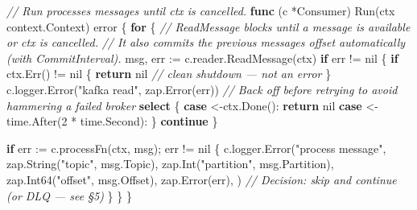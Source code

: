 \documentclass[
]{article}
\newenvironment{Shaded}{}{}
\newcommand{\CommentTok}[1]{\textcolor[rgb]{0.38,0.63,0.69}{\textit{#1}}}
\newcommand{\ControlFlowTok}[1]{\textcolor[rgb]{0.00,0.44,0.13}{\textbf{#1}}}
\newcommand{\DataTypeTok}[1]{\textcolor[rgb]{0.56,0.13,0.00}{#1}}
\newcommand{\DecValTok}[1]{\textcolor[rgb]{0.25,0.63,0.44}{#1}}
\newcommand{\KeywordTok}[1]{\textcolor[rgb]{0.00,0.44,0.13}{\textbf{#1}}}
\newcommand{\NormalTok}[1]{#1}
\newcommand{\OperatorTok}[1]{\textcolor[rgb]{0.40,0.40,0.40}{#1}}
\newcommand{\OtherTok}[1]{\textcolor[rgb]{0.00,0.44,0.13}{#1}}
\newcommand{\StringTok}[1]{\textcolor[rgb]{0.25,0.44,0.63}{#1}}
\begin{document}
\begin{Shaded}
\begin{Highlighting}[]
\CommentTok{// Run processes messages until ctx is cancelled.}
\KeywordTok{func} \OperatorTok{(}\NormalTok{c }\OperatorTok{*}\NormalTok{Consumer}\OperatorTok{)}\NormalTok{ Run}\OperatorTok{(}\NormalTok{ctx context}\OperatorTok{.}\NormalTok{Context}\OperatorTok{)} \DataTypeTok{error} \OperatorTok{\{}
    \ControlFlowTok{for} \OperatorTok{\{}
        \CommentTok{// ReadMessage blocks until a message is available or ctx is cancelled.}
        \CommentTok{// It also commits the previous message\textquotesingle{}s offset automatically (with CommitInterval).}
\NormalTok{        msg}\OperatorTok{,}\NormalTok{ err }\OperatorTok{:=}\NormalTok{ c}\OperatorTok{.}\NormalTok{reader}\OperatorTok{.}\NormalTok{ReadMessage}\OperatorTok{(}\NormalTok{ctx}\OperatorTok{)}
        \ControlFlowTok{if}\NormalTok{ err }\OperatorTok{!=} \OtherTok{nil} \OperatorTok{\{}
            \ControlFlowTok{if}\NormalTok{ ctx}\OperatorTok{.}\NormalTok{Err}\OperatorTok{()} \OperatorTok{!=} \OtherTok{nil} \OperatorTok{\{}
                \ControlFlowTok{return} \OtherTok{nil} \CommentTok{// clean shutdown — not an error}
            \OperatorTok{\}}
\NormalTok{            c}\OperatorTok{.}\NormalTok{logger}\OperatorTok{.}\NormalTok{Error}\OperatorTok{(}\StringTok{"kafka read"}\OperatorTok{,}\NormalTok{ zap}\OperatorTok{.}\NormalTok{Error}\OperatorTok{(}\NormalTok{err}\OperatorTok{))}
            \CommentTok{// Back off before retrying to avoid hammering a failed broker}
            \ControlFlowTok{select} \OperatorTok{\{}
            \ControlFlowTok{case} \OperatorTok{\textless{}{-}}\NormalTok{ctx}\OperatorTok{.}\NormalTok{Done}\OperatorTok{():}
                \ControlFlowTok{return} \OtherTok{nil}
            \ControlFlowTok{case} \OperatorTok{\textless{}{-}}\NormalTok{time}\OperatorTok{.}\NormalTok{After}\OperatorTok{(}\DecValTok{2} \OperatorTok{*}\NormalTok{ time}\OperatorTok{.}\NormalTok{Second}\OperatorTok{):}
            \OperatorTok{\}}
            \ControlFlowTok{continue}
        \OperatorTok{\}}

        \ControlFlowTok{if}\NormalTok{ err }\OperatorTok{:=}\NormalTok{ c}\OperatorTok{.}\NormalTok{processFn}\OperatorTok{(}\NormalTok{ctx}\OperatorTok{,}\NormalTok{ msg}\OperatorTok{);}\NormalTok{ err }\OperatorTok{!=} \OtherTok{nil} \OperatorTok{\{}
\NormalTok{            c}\OperatorTok{.}\NormalTok{logger}\OperatorTok{.}\NormalTok{Error}\OperatorTok{(}\StringTok{"process message"}\OperatorTok{,}
\NormalTok{                zap}\OperatorTok{.}\NormalTok{String}\OperatorTok{(}\StringTok{"topic"}\OperatorTok{,}\NormalTok{ msg}\OperatorTok{.}\NormalTok{Topic}\OperatorTok{),}
\NormalTok{                zap}\OperatorTok{.}\NormalTok{Int}\OperatorTok{(}\StringTok{"partition"}\OperatorTok{,}\NormalTok{ msg}\OperatorTok{.}\NormalTok{Partition}\OperatorTok{),}
\NormalTok{                zap}\OperatorTok{.}\NormalTok{Int64}\OperatorTok{(}\StringTok{"offset"}\OperatorTok{,}\NormalTok{ msg}\OperatorTok{.}\NormalTok{Offset}\OperatorTok{),}
\NormalTok{                zap}\OperatorTok{.}\NormalTok{Error}\OperatorTok{(}\NormalTok{err}\OperatorTok{),}
            \OperatorTok{)}
            \CommentTok{// Decision: skip and continue (or DLQ — see §5)}
        \OperatorTok{\}}
    \OperatorTok{\}}
\OperatorTok{\}}


\end{Highlighting}
\end{Shaded}
\end{document}
